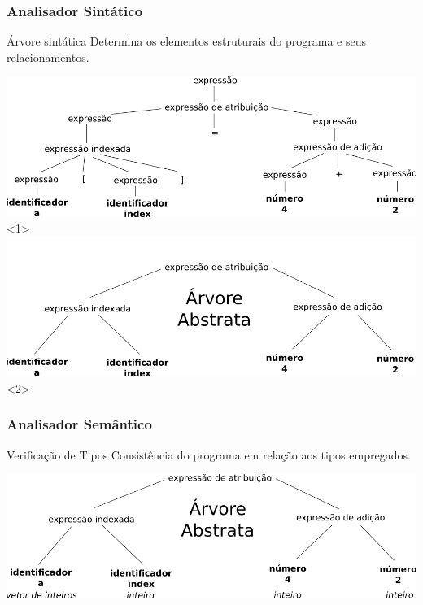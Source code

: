\documentclass[table]{beamer}
\begin{document}
\begin{frame}
   \frametitle{Analisador Sintático}
   \begin{block}{Árvore sintática}
   Determina os elementos estruturais do programa e seus relacionamentos.
   \end{block}
   \includegraphics[width=\linewidth,height=\textheight,keepaspectratio]{figuras/arvoresintatica.png}<1>
   \includegraphics[width=\linewidth,height=\textheight,keepaspectratio]{figuras/arvoresintaticaabstrata.png}<2>
\end{frame}

\begin{frame}
   \frametitle{Analisador Semântico}
   \begin{block}{Verificação de Tipos}
   Consistência do programa em relação aos tipos empregados.
   \end{block}
   \vspace{1.0cm}
   \includegraphics[width=\linewidth,height=\textheight,keepaspectratio]{figuras/arvoresemantica.png}
\end{frame}
\end{document}
